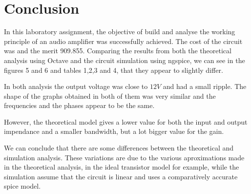 \section{Conclusion}
\label{sec:conclusion}
In this laboratory assignment, the objective of build and analyse the working principle of an audio amplifier was successfully achieved.
The cost of the circuit was  and the merit 909.855.
Comparing the results from both the theoretical analysis using Octave and the circuit simulation using ngspice, we can see in the figures 5 and 6 and tables 1,2,3 and 4, that they appear to slightly differ.

In both analysis the output voltage was close to $12 V$ and had a small ripple. The shape of the graphs obtained in both of them was very similar and the frequencies and the phases appear to be the same.

However, the theoretical model gives a lower value for both the input and output impendance and a smaller bandwidth, but a lot bigger value for the gain. 

We can conclude that there are some differences between the theoretical and simulation analysis. These variations are due to the various aproximations made in the theoretical analysis, in the ideal transistor model for example, while the simulation assume that the circuit is linear and uses a comparatively accurate spice model.  



